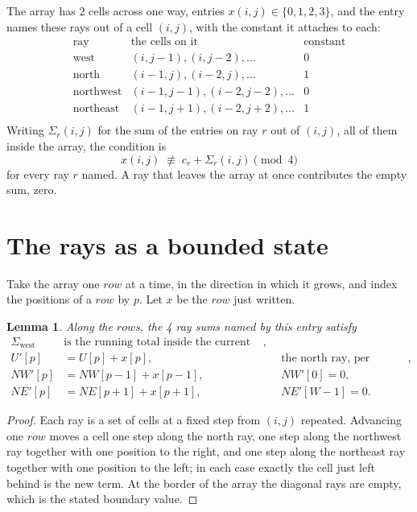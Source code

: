 \documentclass[11pt,a4paper]{article}
\theoremstyle{plain}
\newtheorem{lemma}[theorem]{Lemma}
\theoremstyle{definition}
\begin{document}
The array has $2$ cells across one way, entries $x(i,j)\in\{0,1,2,3\}$, and the entry names these
rays out of a cell $(i,j)$, with the constant it attaches to each:
\[
\begin{array}{lll}
\text{ray} & \text{the cells on it} & \text{constant} \\[2pt]
\text{west} & (i,j-1),(i,j-2),\dots & 0 \\
\text{north} & (i-1,j),(i-2,j),\dots & 1 \\
\text{northwest} & (i-1,j-1),(i-2,j-2),\dots & 0 \\
\text{northeast} & (i-1,j+1),(i-2,j+2),\dots & 1 \\
\end{array}
\]
Writing $\Sigma_r(i,j)$ for the sum of the entries on ray $r$ out of $(i,j)$, all of them
inside the array, the condition is
\[
x(i,j)\;\not\equiv\;c_r+\Sigma_r(i,j) \pmod{4}
\]
for every ray $r$ named. A ray that leaves the array at once contributes the empty sum,
zero.

\section{The rays as a bounded state}

Take the array one $row$ at a time, in the direction in which it grows, and index the
positions of a $row $ by $p$. Let $x$ be the $row$ just written.

\begin{lemma}\label{lem:rays}
Along the $row$s, the 4 ray sums named by this entry satisfy
\[
\begin{aligned}
\Sigma_{\mathrm{west}}\ &\text{is the running total inside the current row},\\
U'[p]&=U[p]+x[p], &&\text{the north ray, per position},\\
NW'[p]&=NW[p-1]+x[p-1], && NW'[0]=0,\\
NE'[p]&=NE[p+1]+x[p+1], && NE'[W-1]=0 .
\end{aligned}
\]
\end{lemma}

\begin{proof}
Each ray is a set of cells at a fixed step from $(i,j)$ repeated. Advancing one $row$
moves a cell one step along the north ray, one step along the northwest ray together with one
position to the right, and one step along the northeast ray together with one position to the
left; in each case exactly the cell just left behind is the new term. At the border of the
array the diagonal rays are empty, which is the stated boundary value.
\end{proof}
\end{document}
